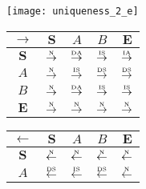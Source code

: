 \begin{figure}[htbp]\ContinuedFloat
  \centering
  \begin{subfigure}{1\textwidth}
    \centering
    \begin{minipage}[b]{1\textwidth}
      \centering
      \texttt{[image: uniqueness\_2\_e]}
    \end{minipage}
    \begin{minipage}[b]{0.3\textwidth}
      \vspace{1em}
      \centering
      \begin{tabular}{|c|c|c|c|c|} \hline
        $\rightarrow$ & $\bm{S}$ & $A$ & $B$ & $\bm{E}$\\ \hline
        $\bm{S}$ & $\overset{\text{\tiny{N}}}{\rightarrow}$ & $\overset{\text{\tiny{DA}}}{\rightarrow}$ & $\overset{\text{\tiny{IS}}}{\rightarrow}$ & $\overset{\text{\tiny{IA}}}{\rightarrow}$\\ \hline
        $A$ & $\overset{\text{\tiny{N}}}{\rightarrow}$ & $\overset{\text{\tiny{IS}}}{\rightarrow}$ & $\overset{\text{\tiny{DS}}}{\rightarrow}$ & $\overset{\text{\tiny{DS}}}{\rightarrow}$\\ \hline
        $B$ & $\overset{\text{\tiny{N}}}{\rightarrow}$ & $\overset{\text{\tiny{DA}}}{\rightarrow}$ & $\overset{\text{\tiny{IS}}}{\rightarrow}$ & $\overset{\text{\tiny{IS}}}{\rightarrow}$\\ \hline
        $\bm{E}$ & $\overset{\text{\tiny{N}}}{\rightarrow}$ & $\overset{\text{\tiny{N}}}{\rightarrow}$ & $\overset{\text{\tiny{N}}}{\rightarrow}$ & $\overset{\text{\tiny{N}}}{\rightarrow}$\\ \hline
      \end{tabular}
    \end{minipage}
    \begin{minipage}[b]{0.3\textwidth}
      \vspace{1em}
      \centering
      \begin{tabular}{|c|c|c|c|c|} \hline
        $\leftarrow$ & $\bm{S}$ & $A$ & $B$ & $\bm{E}$\\ \hline
        $\bm{S}$ & $\overset{\text{\tiny{N}}}{\leftarrow}$ & $\overset{\text{\tiny{N}}}{\leftarrow}$ & $\overset{\text{\tiny{N}}}{\leftarrow}$ & $\overset{\text{\tiny{N}}}{\leftarrow}$\\ \hline
        $A$ & $\overset{\text{\tiny{DS}}}{\leftarrow}$ & $\overset{\text{\tiny{IS}}}{\leftarrow}$ & $\overset{\text{\tiny{DS}}}{\leftarrow}$ & $\overset{\text{\tiny{N}}}{\leftarrow}$\\ \hline

\end{tabular}
\end{minipage}
\end{subfigure}
\end{figure}
